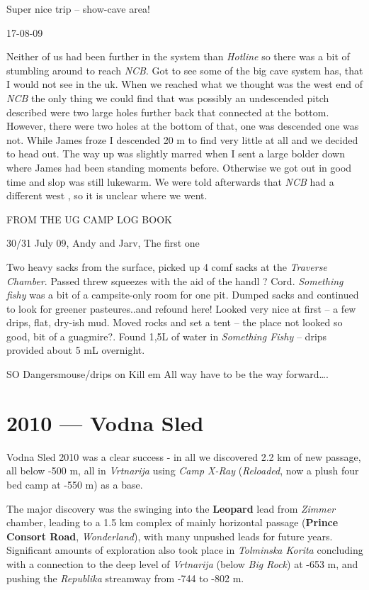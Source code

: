 Super nice trip -- show-cave area!

17-08-09

Neither of us had been further in the system than \emph{Hotline} so
there was a bit of stumbling around to reach \emph{NCB}. Got to see some
of the big cave system has, that I would not see in the uk. When we
reached what we thought was the west end of \emph{NCB} the only thing we
could find that was possibly an undescended pitch described were two
large holes further back that connected at the bottom. However, there
were two holes at the bottom of that, one was descended one was not.
While James froze I descended 20 m to find very little at all and we
decided to head out. The way up was slightly marred when I sent a large
bolder down where James had been standing moments before. Otherwise we
got out in good time and slop was still lukewarm. We were told
afterwards that \emph{NCB} had a different west , so it is unclear where
we went.

FROM THE UG CAMP LOG BOOK

30/31 July 09, Andy and Jarv, The first one

Two heavy sacks from the surface, picked up 4 comf sacks at the
\emph{Traverse Chamber}. Passed threw squeezes with the aid of the handl
? Cord. \emph{Something fishy} was a bit of a campsite-only room for one
pit. Dumped sacks and continued to look for greener pasteures..and
refound here! Looked very nice at first -- a few drips, flat, dry-ish
mud. Moved rocks and set a tent -- the place not looked so good, bit of
a guagmire?. Found 1,5L of water in \emph{Something Fishy} -- drips
provided about 5 mL overnight.

SO Dangersmouse/drips on Kill em All way have to be the way
forward\ldots{}.

\hypertarget{vodna-sled}{%
\chapter{2010 --- Vodna Sled}\label{vodna-sled}}

Vodna Sled 2010 was a clear success - in all we discovered 2.2 km of new
passage, all below -500 m, all in \emph{Vrtnarija} using \emph{Camp
X-Ray} (\emph{Reloaded}, now a plush four bed camp at -550 m) as a base.

The major discovery was the swinging into the \textbf{Leopard} lead from
\emph{Zimmer} chamber, leading to a 1.5 km complex of mainly horizontal
passage (\textbf{Prince Consort Road}, \emph{Wonderland}), with many
unpushed leads for future years. Significant amounts of exploration also
took place in \emph{Tolminska Korita} concluding with a connection to
the deep level of \emph{Vrtnarija} (below \emph{Big Rock}) at -653 m,
and pushing the \emph{Republika} streamway from -744 to -802 m.

